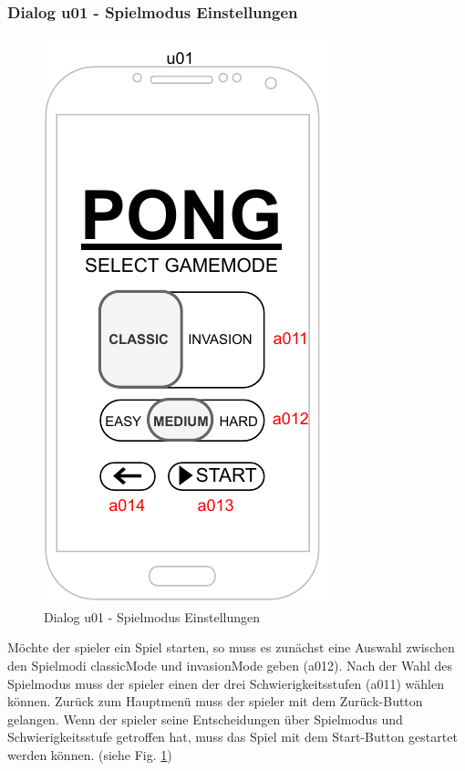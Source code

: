 \subsubsection{Dialog u01 - Spielmodus Einstellungen}\label{dialog:einstellungen}

\begin{figure}[h!]
    \begin{center}
    \includegraphics[scale=1.4]{diagramme/pdf/Mockup-u01.pdf}
    \end{center}
    \caption{Dialog u01 - Spielmodus Einstellungen}\label{fig:dia:u01}
\end{figure}

Möchte der \gls{spieler} ein Spiel starten, so muss es zunächst eine Auswahl zwischen den Spielmodi \gls{classicMode} und \gls{invasionMode} geben (a012). Nach der Wahl des Spielmodus muss der \gls{spieler} einen der drei Schwierigkeitsstufen (a011) wählen können.
Zurück zum Hauptmenü muss der \gls{spieler} mit dem Zurück-Button gelangen. Wenn der \gls{spieler} seine Entscheidungen über Spielmodus und Schwierigkeitsstufe getroffen hat, muss das Spiel mit dem Start-Button gestartet werden können.
(siehe Fig. \ref{fig:dia:u01})
\clearpage

